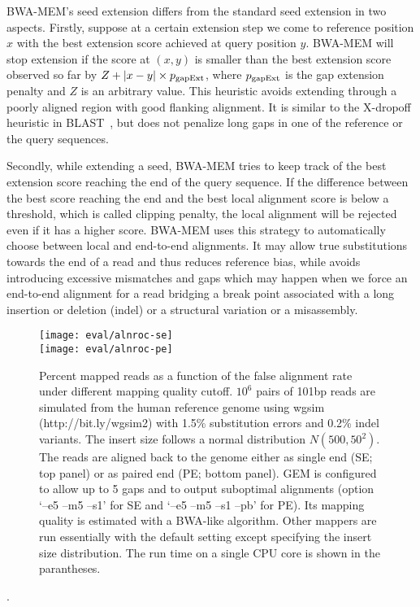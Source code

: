 \documentclass{bioinfo}
\begin{document}
\begin{methods}
BWA-MEM's seed extension differs from the standard seed extension in two
aspects. Firstly, suppose at a certain extension step we come to reference
position $x$ with the best extension score achieved at query position $y$.
BWA-MEM will stop extension if the score at $(x,y)$ is smaller than the best
extension score observed so far by $Z+|x-y|\times p_{\rm gapExt}$, where
$p_{\rm gapExt}$ is the gap extension penalty and $Z$ is an arbitrary value. This heuristic avoids extending
through a poorly aligned region with good flanking alignment. It is similar
to the X-dropoff heuristic in BLAST~\citep{Altschul:1997vn}, but does not penalize long gaps in
one of the reference or the query sequences.

Secondly, while extending a seed, BWA-MEM tries to keep track of the best
extension score reaching the end of the query sequence. If the difference
between the best score reaching the end and the best local alignment score is
below a threshold, which is called clipping penalty, the local alignment will
be rejected even if it has a higher score. BWA-MEM uses this strategy to
automatically choose between local and end-to-end alignments. It may allow true
substitutions towards the end of a read and thus reduces reference bias, while
avoids introducing excessive mismatches and gaps which may happen when we force
an end-to-end alignment for a read bridging a break point associated with a
long insertion or deletion (indel) or a structural variation or a misassembly.

\begin{figure}[tb]
\centering
\texttt{[image: eval/alnroc-se]}\\
\texttt{[image: eval/alnroc-pe]}
\caption{Percent mapped reads as a function of the false alignment rate under
different mapping quality cutoff. $10^6$ pairs of 101bp reads are simulated
from the human reference genome using wgsim (http://bit.ly/wgsim2) with 1.5\%
substitution errors and 0.2\% indel variants. The insert size follows a normal
distribution $N(500,50^2)$. The reads are aligned back to the genome either as
single end (SE; top panel) or as paired end (PE; bottom panel). GEM is configured to
allow up to 5 gaps and to output suboptimal alignments (option `--e5 --m5 --s1' for SE and `--e5 --m5 --s1 --pb' for PE). Its
mapping quality is estimated with a BWA-like algorithm. Other mappers are run
essentially with the default setting except specifying the insert size
distribution. The run time on a single CPU core is shown in the parantheses.}\label{fig:eval}
\end{figure}.


\end{methods}
\end{document}
